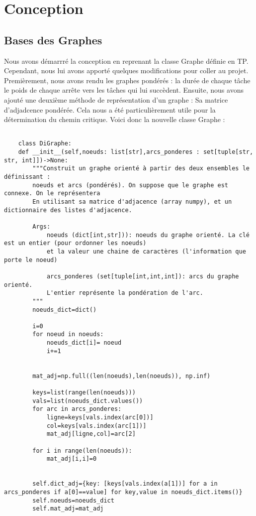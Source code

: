 \documentclass{article}
\begin{document}
\section{Conception}
\subsection{Bases des Graphes}
Nous avons démarrré la conception en reprenant la classe Graphe définie en TP.
Cependant, nous lui avons apporté quelques modifications pour coller au projet. Premièrement, nous avons rendu les graphes pondérés : la durée de chaque
tâche le poids de chaque arrête vers les tâches qui lui succèdent.
Ensuite, nous avons ajouté une deuxième méthode de représentation d'un graphe : Sa matrice d'adjadcence pondérée. Cela nous a été particulièrement
utile pour la détermination du chemin critique.
Voici donc la nouvelle classe Graphe :

\begin{verbatim}

    class DiGraphe:
    def __init__(self,noeuds: list[str],arcs_ponderes : set[tuple[str, str, int]])->None:
        """Construit un graphe orienté à partir des deux ensembles le définissant :
        noeuds et arcs (pondérés). On suppose que le graphe est connexe. On le représentera
        En utilisant sa matrice d'adjacence (array numpy), et un dictionnaire des listes d'adjacence.

        Args:
            noeuds (dict[int,str])): noeuds du graphe orienté. La clé est un entier (pour ordonner les noeuds)
            et la valeur une chaine de caractères (l'information que porte le noeud)
            
            arcs_ponderes (set[tuple[int,int,int]): arcs du graphe orienté. 
            L'entier représente la pondération de l'arc.
        """
        noeuds_dict=dict()
        
        i=0
        for noeud in noeuds:
            noeuds_dict[i]= noeud
            i+=1
        
        
        mat_adj=np.full((len(noeuds),len(noeuds)), np.inf)
        
        keys=list(range(len(noeuds)))
        vals=list(noeuds_dict.values())
        for arc in arcs_ponderes:
            ligne=keys[vals.index(arc[0])]
            col=keys[vals.index(arc[1])]
            mat_adj[ligne,col]=arc[2]

        for i in range(len(noeuds)):
            mat_adj[i,i]=0
            
        
        self.dict_adj={key: [keys[vals.index(a[1])] for a in arcs_ponderes if a[0]==value] for key,value in noeuds_dict.items()}
        self.noeuds=noeuds_dict
        self.mat_adj=mat_adj
\end{verbatim}
\end{document}
